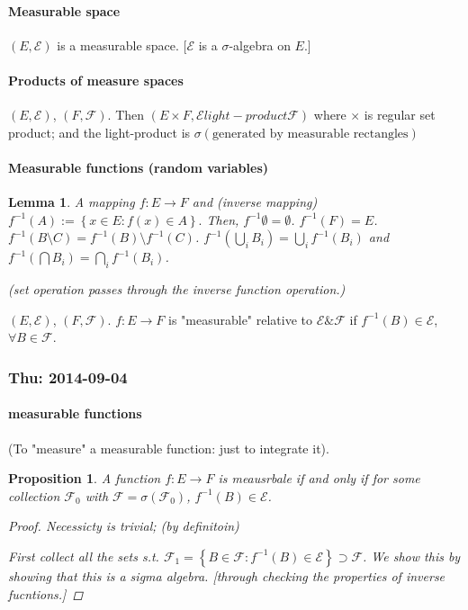 \documentclass[11pt]{article}
\newtheorem{lemma}[theorem]{Lemma}
\newtheorem{proposition}[theorem]{Proposition}
\begin{document}
\paragraph{Measurable space }
$(E, \mathcal E)$ is a measurable space. [$\mathcal E$ is a $\sigma$-algebra on
$E$.]

\paragraph{Products of measure spaces} $(E, \mathcal E)$, $(F, \mathcal F)$.
Then $\left( E \times F, \mathcal E light-product \mathcal F \right)$ where
$\times$ is regular set product; and the light-product is $\sigma \left( \text{
generated by measurable rectangles} 
\right)$

\paragraph{Measurable functions (random variables)}
\begin{lemma}
  A mapping $f: E\to F$ and (inverse mapping) $f^{-1} (A) := \left\{ x \in E :
    f(x) \in A
  \right\}.$ Then, $f^{-1} \emptyset = \emptyset$. $f^{-1}(F) = E$. $f^{-1}
  (B\setminus C) = f^{-1} (B) \setminus f^{-1} (C)$. 
  $f^{-1}\left( \bigcup _ i B_i \right) = \bigcup _i f^{-1}(B_i)$ and $f^{-1}\left( \bigcap B_i \right) =
  \bigcap _ i f^{-1}\left( B_i \right)$.


  (set operation passes through the inverse function operation.)
  \label{lemma:measurable-function}
\end{lemma}


\begin{definition}
  $(E, \mathcal E)$, $(F, \mathcal F)$. $f: E\to F$ is "measurable" relative to
  $\mathcal E \& \mathcal F$ if $f^{-1}(B) \in \mathcal E$, $\forall B \in
  \mathcal F$. 
\end{definition}




\subsubsection{Thu: 2014-09-04 }
\paragraph{measurable functions}
(To "measure" a measurable function: just to integrate it).

\begin{proposition}
  A function $f: E \to F$ is meausrbale if and only if for some collection
  $\mathcal F_0$ with $\mathcal F = \sigma ( \mathcal F _0)$, $f^{-1}(B) \in
  \mathcal E$.
  \begin{proof}
    Necessicty is trivial; (by definitoin)

    First collect all the sets s.t. $\mathcal F_1 = \left\{ B \in \mathcal F :
      f^{-1}(B) \in \mathcal E \right\} \supset \mathcal F$. We show this by
      showing that this is a sigma algebra.  [through checking the properties of
      inverse fucntions.]
  \end{proof}
\end{proposition}
\end{document}
